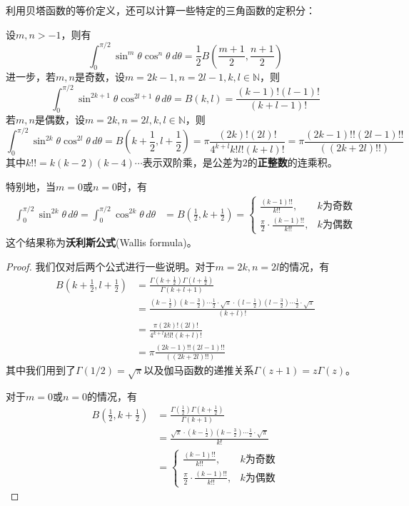 利用贝塔函数的等价定义，还可以计算一些特定的三角函数的定积分：
\begin{proposition}
    设$m,n>-1$，则有
    \[\int_{0}^{\pi/2}\sin^m\theta\cos^n\theta\,d\theta=\frac{1}{2}B\left(\frac{m+1}{2},\frac{n+1}{2}\right)\]
    进一步，若$m,n$是奇数，设$m=2k-1,n=2l-1,k,l\in\mathbb{N}$，则
    \[\int_{0}^{\pi/2}\sin^{2k+1}\theta\cos^{2l+1}\theta\,d\theta=B(k,l)=\frac{(k-1)!(l-1)!}{(k+l-1)!}\]
    若$m,n$是偶数，设$m=2k,n=2l,k,l\in\mathbb{N}$，则
    \[\int_{0}^{\pi/2}\sin^{2k}\theta\cos^{2l}\theta\,d\theta=B\left(k+\frac{1}{2},l+\frac{1}{2}\right)=\pi\frac{(2k)!(2l)!}{4^{k+l}k!l!(k+l)!}=\pi\frac{(2k-1)!!(2l-1)!!}{((2k+2l)!!)}\]
    其中$k!!=k(k-2)(k-4)\cdots$表示双阶乘，是公差为$2$的\textbf{正整数}的连乘积。

    特别地，当$m=0$或$n=0$时，有
    \begin{align*}
        \int_{0}^{\pi/2}\sin^{2k}\theta\,d\theta=\int_{0}^{\pi/2}\cos^{2k}\theta\,d\theta&=B\left(\frac{1}{2},k+\frac{1}{2}\right)=\begin{cases}
            \frac{(k-1)!!}{k!!}, & k\text{为奇数} \\
            \frac{\pi}{2}\cdot\frac{(k-1)!!}{k!!}, & k\text{为偶数}
        \end{cases}
    \end{align*}
    这个结果称为\textbf{沃利斯公式}(Wallis formula)。
\end{proposition}
\begin{proof}
    我们仅对后两个公式进行一些说明。对于$m=2k,n=2l$的情况，有
    \begin{align*}
        B\left(k+\frac{1}{2},l+\frac{1}{2}\right)&=\frac{\Gamma \left(k+\frac{1}{2}\right)\Gamma \left(l+\frac{1}{2}\right)}{\Gamma \left(k+l+1\right)}\\
        &=\frac{\left(k-\frac{1}{2}\right)\left(k-\frac{3}{2}\right)\cdots\frac{1}{2}\cdot\sqrt{\pi}\cdot\left(l-\frac{1}{2}\right)\left(l-\frac{3}{2}\right)\cdots\frac{1}{2}\cdot\sqrt{\pi}}{(k+l)!}\\
        &=\frac{\pi(2k)!(2l)!}{4^{k+l}k!l!(k+l)!}\\
        &=\pi\frac{(2k-1)!!(2l-1)!!}{((2k+2l)!!)}
    \end{align*}
    其中我们用到了$\Gamma(1/2)=\sqrt{\pi}$以及伽马函数的递推关系$\Gamma(z+1)=z\Gamma(z)$。
    
    对于$m=0$或$n=0$的情况，有
    \begin{align*}
        B\left(\frac{1}{2},k+\frac{1}{2}\right)&=\frac{\Gamma \left(\frac{1}{2}\right)\Gamma \left(k+\frac{1}{2}\right)}{\Gamma \left(k+1\right)}\\
                                             &=\frac{\sqrt{\pi}\cdot\left(k-\frac{1}{2}\right)\left(k-\frac{3}{2}\right)\cdots\frac{1}{2}\cdot\sqrt{\pi}}{k!}\\
                                             &=\begin{cases}
            \frac{(k-1)!!}{k!!}, & k\text{为奇数} \\
            \frac{\pi}{2}\cdot\frac{(k-1)!!}{k!!}, & k\text{为偶数}
        \end{cases}
    \end{align*}
\end{proof}

